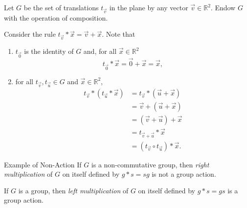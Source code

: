 
\begin{exmp}{}{}
Let \(G\) be the set of translations \(t_{\vec v}\) in the plane by any vector \(\vec v \in \mathbb{R}^2\).
Endow \(G\) with the operation of composition.

Consider the rule \(t_{\vec v} * \vec x = \vec v + \vec x\). Note that 
\begin{enumerate}
  \item \(t_{\vec 0}\) is the identity of \(G\) and, for all \(\vec x \in \mathbb{R}^2\) \[
	  t_{\vec 0} * \vec x = \vec 0 + \vec x = \vec x,
	\]
  \item for all \(t_{\vec v}, t_{\vec u} \in G\) and \(\vec x \in \mathbb{R}^2\),
	\begin{align*}
		t_{\vec v} * (t_{\vec u} * \vec x)
			&= t_{\vec v} * (\vec u + \vec x) \\
			&= \vec v + (\vec u + \vec x) \\
			&= (\vec v + \vec u) + \vec x \\
			&= t_{\vec v + \vec u} * \vec x \\
			&= (t_{\vec v} \circ t_{\vec u}) * \vec x.
	\end{align*}
\end{enumerate} 
\end{exmp}

\begin{exmp}{Example of Non-Action}{}
	If \(G\) is a non-commutative group, then \emph{right multiplication} of \(G\) on itself defined by \(g * s = sg\) is not a group action.
\end{exmp}

\begin{exmp}{}{}
	If \(G\) is a group, then \emph{left multiplication} of \(G\) on itself defined by \(g * s = gs\) is a group action.
\end{exmp}
